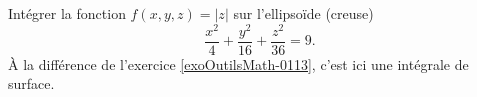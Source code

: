 
\begin{exercice}\label{exoOutilsMath-0117}

    Intégrer la fonction $f(x,y,z)=| z |$ sur l'ellipsoïde (creuse)
    \begin{equation}
        \frac{ x^2 }{ 4 }+\frac{ y^2 }{ 16 }+\frac{ z^2 }{ 36 }= 9.
    \end{equation}
    À la différence de l'exercice \ref{exoOutilsMath-0113}, c'est ici une intégrale de surface.

\end{exercice}
